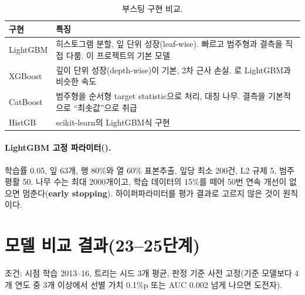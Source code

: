 \begin{table}[H]\centering\small
\begin{tabularx}{\linewidth}{@{}p{28mm}L@{}}\toprule
구현 & 특징\\\midrule
LightGBM & 히스토그램 분할, 잎 단위 성장(leaf-wise). 빠르고 범주형과 결측을 직접 다룸. 이 프로젝트의 기본 모델\\
XGBoost & 깊이 단위 성장(depth-wise)이 기본, 2차 근사 손실. 로 LightGBM과 비슷한 속도\\
CatBoost & 범주형을 순서형 target statistic으로 처리, 대칭 나무. 결측을 기본적으로 ``최솟값''으로 취급\\
HistGB & scikit-learn의 LightGBM식 구현\\\bottomrule
\end{tabularx}
\caption{부스팅 구현 비교.}
\end{table}

\paragraph{LightGBM 고정 파라미터().} 학습률 0.05, 잎 63개, 행 80\%와 열 60\% 표본추출, 잎당 최소 200건, L2 규제 5, 범주 평활 50. 나무 수는 최대 2000개이고, 학습 데이터의 15\%를 떼어 50번 연속 개선이 없으면 멈춘다(\textbf{early stopping}). 하이퍼파라미터를 평가 결과로 고르지 않은 것이 원칙이다.

\section{모델 비교 결과(23--25단계)}
조건: 시점 학습 2013--16, 트리는 시드 3개 평균, 판정 기준 사전 고정(기준 모델보다 4개 연도 중 3개 이상에서 선별 가치 0.1\%p 또는 AUC 0.002 넘게 나으면 도전자).

